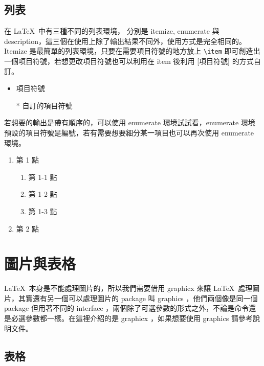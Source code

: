 \section{列表}

在 \LaTeX\ 中有三種不同的列表環境， 分別是 itemize, enumerate 與 description，這三個在使用上除了輸出結果不同外，使用方式是完全相同的。Itemize 是最簡單的列表環境，只要在需要項目符號的地方放上 \verb|\item| 即可創造出一個項目符號，若想更改項目符號也可以利用在 item 後利用 [項目符號] 的方式自訂。

\begin{tcblisting}{}
\begin{itemize}
\item 項目符號
\item[*] 自訂的項目符號 
\end{itemize}
\end{tcblisting}

若想要的輸出是帶有順序的，可以使用 enumerate 環境試試看，enumerate 環境預設的項目符號是編號，若有需要想要細分某一項目也可以再次使用 enumerate 環境。

\begin{tcblisting}{}
\begin{enumerate}
\item 第 1 點
\begin{enumerate}
\item 第 1-1 點
\item 第 1-2 點
\item 第 1-3 點
\end{enumerate}
\item 第 2 點
\end{enumerate}
\end{tcblisting}


\chapter{圖片與表格}

\LaTeX\ 本身是不能處理圖片的，所以我們需要借用 graphicx 來讓 \LaTeX\ 處理圖片，其實還有另一個可以處理圖片的 package 叫 graphics ，他們兩個像是同一個 package 但用著不同的 interface ，兩個除了可選參數的形式之外，不論是命令還是必選參數都一樣。在這裡介紹的是 graphicx ，如果想要使用 graphics 請參考說明文件。

\section{表格}

